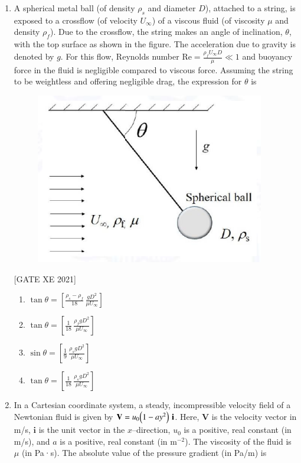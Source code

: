 \documentclass[journal,12pt,onecolumn]{IEEEtran}
\theoremstyle{remark}
\begin{document}
\begin{enumerate}
\item A spherical metal ball (of density $\rho_s$ and diameter $D$), attached to a string, is exposed to a crossflow (of velocity $U_\infty$) of a viscous fluid (of viscosity $\mu$ and density $\rho_f$). Due to the crossflow, the string makes an angle of inclination, $\theta$, with the top surface as shown in the figure. The acceleration due to gravity is denoted by $g$. For this flow, Reynolds number $\displaystyle \mathrm{Re}=\frac{\rho_f U_\infty D}{\mu}\ll 1$ and buoyancy force in the fluid is negligible compared to viscous force. Assuming the string to be weightless and offering negligible drag, the expression for $\theta$ is

\begin{figure}[H]
      \centering
      \includegraphics[width=0.5\columnwidth]{figs/fig10.png}
      \caption{}
      \label{fig:placeholder}
  \end{figure}

\hfill[GATE XE 2021]

\begin{multicols}{2}
\begin{enumerate}
\item $\displaystyle \tan\theta=\left[\frac{\rho_s-\rho_f}{18}\,\frac{gD^2}{\mu U_\infty}\right]$
\item $\displaystyle \tan\theta=\left[\frac{1}{18}\,\frac{\rho_f gD^2}{\mu U_\infty}\right]$
\item $\displaystyle \sin\theta=\left[\frac{1}{9}\,\frac{\rho_s gD^2}{\mu U_\infty}\right]$
\item $\displaystyle \tan\theta=\left[\frac{1}{18}\,\frac{\rho_s gD^2}{\mu U_\infty}\right]$
\end{enumerate}
\end{multicols}


\item In a Cartesian coordinate system, a steady, incompressible velocity field of a Newtonian fluid is given by $\mathbf{V}=u_0\!\left(1-a y^2\right)\,\mathbf{i}$. Here, $\mathbf{V}$ is the velocity vector in m/s, $\mathbf{i}$ is the unit vector in the $x$–direction, $u_0$ is a positive, real constant (in m/s), and $a$ is a positive, real constant (in m$^{-2}$). The viscosity of the fluid is $\mu$ (in Pa·s). The absolute value of the pressure gradient (in Pa/m) is


\end{enumerate}
\end{document}
